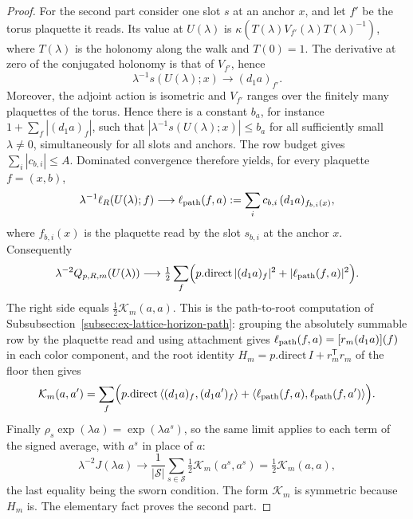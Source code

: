 \begin{proof}
For the second part consider one slot $s$ at an anchor $x$, and let
$f'$ be the torus plaquette it reads. Its value at $U(\lambda)$ is
$\kappa(T(\lambda)V_{f'}(\lambda)T(\lambda)^{-1})$, where $T(\lambda)$
is the holonomy along the walk and $T(0)=1$. The derivative at zero of
the conjugated holonomy is that of $V_{f'}$, hence
\[
 \lambda^{-1}s(U(\lambda);x)\longrightarrow(d_1a)_{f'} .
\]
Moreover, the adjoint action is isometric and $V_{f'}$ ranges over
the finitely many plaquettes of the torus. Hence there is a constant
$b_a$, for instance $1+\sum_f|(d_1a)_f|$, such that
$|\lambda^{-1}s(U(\lambda);x)|\leq b_a$ for all sufficiently small
$\lambda\neq0$, simultaneously for all slots and anchors. The row
budget gives $\sum_i|c_{b,i}|\leq A$. Dominated convergence therefore
yields, for every plaquette $f=(x,b)$,
\[
 \lambda^{-1}\ell_R(U(\lambda);f)\longrightarrow
 \ell_{\rm path}(f,a):=\sum_ic_{b,i}\,(d_1a)_{f_{b,i}(x)},
\]
where $f_{b,i}(x)$ is the plaquette read by the slot $s_{b,i}$ at the
anchor $x$. Consequently
\[
 \lambda^{-2}Q_{p,R,m}(U(\lambda))\longrightarrow
 \tfrac12\sum_f\Bigl(p.\mathrm{direct}\,|(d_1a)_f|^2
              +|\ell_{\rm path}(f,a)|^2\Bigr).
\]
The right side equals $\tfrac12\mathcal K_m(a,a)$. This is the
path-to-root computation of
Subsubsection~\ref{subsec:ex-lattice-horizon-path}: grouping the absolutely
summable row by the plaquette read and using attachment gives
$\ell_{\rm path}(f,a)=[r_m(d_1a)](f)$ in each color component, and
the root identity $H_m=p.\mathrm{direct}\,I+r_m^{\mathsf T}r_m$ of the
floor then gives
\[
 \mathcal K_m(a,a')=\sum_f\Bigl(p.\mathrm{direct}\,
    \langle(d_1a)_f,(d_1a')_f\rangle
    +\langle\ell_{\rm path}(f,a),\ell_{\rm path}(f,a')\rangle\Bigr).
\]
Finally $\rho_s\exp(\lambda a)=\exp(\lambda a^s)$, so the same limit
applies to each term of the signed average, with $a^s$ in place of $a$:
\[
 \lambda^{-2}J(\lambda a)\longrightarrow
 \frac1{|\mathcal S|}\sum_{s\in\mathcal S}\tfrac12\mathcal K_m(a^s,a^s)
 =\tfrac12\mathcal K_m(a,a),
\]
the last equality being the sworn condition. The form $\mathcal K_m$
is symmetric because $H_m$ is. The elementary fact proves the second
part.
\end{proof}

